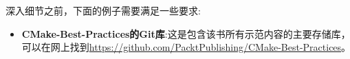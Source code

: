 深入细节之前，下面的例子需要满足一些要求:

\begin{itemize}
\item 
\textbf{CMake-Best-Practices的Git库}:这是包含该书所有示范内容的主要存储库，可以在网上找到\url{https://github.com/PacktPublishing/CMake-Best-Practices}。
\end{itemize}


